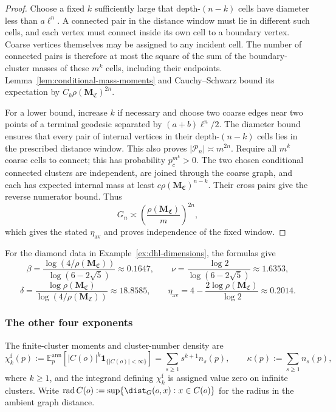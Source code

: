 \begin{proof}
Choose a fixed $k$ sufficiently large that depth-$(n-k)$ cells have diameter less than $a\ell^n$.
A connected pair in the distance window must lie in different such cells, and each vertex must connect inside its own cell to a boundary vertex.
Coarse vertices themselves may be assigned to any incident cell.
The number of connected pairs is therefore at most the square of the sum of the boundary-cluster masses of these $m^k$ cells, including their endpoints.
Lemma~\ref{lem:conditional-mass-moments} and Cauchy--Schwarz bound its expectation by $C_k\rho(\mathbf M_{\mathfrak C})^{2n}$.

For a lower bound, increase $k$ if necessary and choose two coarse edges near two points of a terminal geodesic separated by $(a+b)\ell^n/2$.
The diameter bound ensures that every pair of internal vertices in their depth-$(n-k)$ cells lies in the prescribed distance window.
This also proves $|\mathcal P_n|\asymp m^{2n}$.
Require all $m^k$ coarse cells to connect; this has probability $p_c^{m^k}>0$.
The two chosen conditional connected clusters are independent, are joined through the coarse graph, and each has expected internal mass at least $c\rho(\mathbf M_{\mathfrak C})^{n-k}$.
Their cross pairs give the reverse numerator bound.
Thus
\[
 G_n\asymp\left(\frac{\rho(\mathbf M_{\mathfrak C})}{m}\right)^{2n},
\]
which gives the stated $\eta_{\mathrm{av}}$ and proves independence of the fixed window.
\end{proof}

\begin{example}\label{ex:dhl-four-exponents}
For the diamond data in Example~\ref{ex:dhl-dimensions}, the formulas give
\[
 \beta=\frac{\log(4/\rho(\mathbf M_{\mathfrak C}))}{\log(6-2\sqrt5)}\approx0.1647,
 \qquad
 \nu=\frac{\log2}{\log(6-2\sqrt5)}\approx1.6353,
\]
\[
 \delta=\frac{\log\rho(\mathbf M_{\mathfrak C})}{\log(4/\rho(\mathbf M_{\mathfrak C}))}\approx18.8585,
 \qquad
 \eta_{\mathrm{av}}=4-\frac{2\log\rho(\mathbf M_{\mathfrak C})}{\log2}\approx0.2014.
\]
\end{example}

\subsubsection*{The other four exponents}
The finite-cluster moments and cluster-number density are
\[
 \chi_k^{\mathrm f}(p):=\mathbb E_p^{\mathrm{ann}}
 [|C(o)|^k\mathbf1_{\{|C(o)|<\infty\}}]
 =\sum_{s\ge1}s^{k+1}n_s(p),\qquad
 \kappa(p):=\sum_{s\ge1}n_s(p),
\]
where $k\ge1$, and the integrand defining $\chi_k^{\mathrm f}$ is assigned value zero on infinite clusters.
Write $\operatorname{rad}C(o):=\sup\{\dist_G(o,x):x\in C(o)\}$ for the radius in the ambient graph distance.

